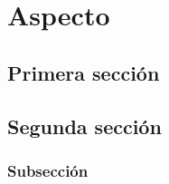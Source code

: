\chapter{Aspecto}
\lipsum[1-5]
\section{Primera sección}
\lipsum[1-5]
\section{Segunda sección}
\lipsum[1-5]
\subsection{Subsección}
\lipsum[1-6]

